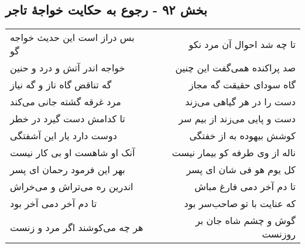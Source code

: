 \begin{center}
\section*{بخش ۹۲ - رجوع به حکایت خواجهٔ تاجر}
\label{sec:sh092}
\begin{longtable}{l p{0.5cm} r}
بس دراز است این حدیث خواجه گو
&&
تا چه شد احوال آن مرد نکو
\\
خواجه اندر آتش و درد و حنین
&&
صد پراکنده همی‌گفت این چنین
\\
گه تناقض گاه ناز و گه نیاز
&&
گاه سودای حقیقت گه مجاز
\\
مرد غرقه گشته جانی می‌کند
&&
دست را در هر گیاهی می‌زند
\\
تا کدامش دست گیرد در خطر
&&
دست و پایی می‌زند از بیم سر
\\
دوست دارد یار این آشفتگی
&&
کوشش بیهوده به از خفتگی
\\
آنک او شاهست او بی کار نیست
&&
ناله از وی طرفه کو بیمار نیست
\\
بهر این فرمود رحمان ای پسر
&&
کل یوم هو فی شان ای پسر
\\
اندرین ره می‌تراش و می‌خراش
&&
تا دم آخر دمی فارغ مباش
\\
تا دم آخر دمی آخر بود
&&
که عنایت با تو صاحب‌سر بود
\\
هر چه می‌کوشند اگر مرد و زنست
&&
گوش و چشم شاه جان بر روزنست
\\
\end{longtable}
\end{center}
